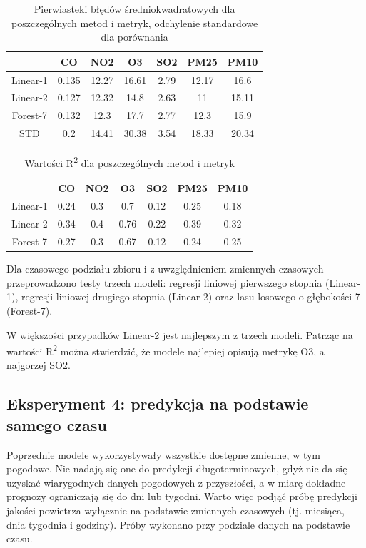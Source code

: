\documentclass[18pt, letterpaper]{article}
\begin{document}
\begin{table}[H]
\centering
\begin{tabular}{|c|c|c|c|c|c|c|}
\hline
         & CO    & NO2   & O3    & SO2  & PM25  & PM10  \\ \hline
Linear-1 & 0.135 & 12.27 & 16.61 & 2.79 & 12.17 & 16.6  \\ \hline
Linear-2 & 0.127 & 12.32 & 14.8  & 2.63 & 11    & 15.11 \\ \hline
Forest-7 & 0.132 & 12.3  & 17.7  & 2.77 & 12.3  & 15.9  \\ \hline
STD      & 0.2   & 14.41 & 30.38 & 3.54 & 18.33 & 20.34 \\ \hline
\end{tabular}
\caption{Pierwiasteki błędów średniokwadratowych dla poszczególnych metod i metryk, odchylenie standardowe dla porównania}
\label{table:general_results}
\end{table}

\begin{table}[H]
\centering
\begin{tabular}{|c|c|c|c|c|c|c|}
\hline
          & CO   & NO2 & O3   & SO2  & PM25 & PM10 \\ \hline
Linear-1 & 0.24 & 0.3 & 0.7  & 0.12 & 0.25 & 0.18 \\ \hline
Linear-2 & 0.34 & 0.4 & 0.76 & 0.22 & 0.39 & 0.32 \\ \hline
Forest-7 & 0.27 & 0.3 & 0.67 & 0.12 & 0.24 & 0.25 \\ \hline
\end{tabular}
\caption{Wartości R\textsuperscript{2} dla poszczególnych metod i metryk}
\label{table:general_results_r2}
\end{table}

Dla czasowego podziału zbioru i z uwzględnieniem zmiennych czasowych przeprowadzono testy trzech modeli: regresji liniowej pierwszego stopnia (Linear-1), regresji liniowej drugiego stopnia (Linear-2) oraz lasu losowego o głębokości 7 (Forest-7). 

W większości przypadków Linear-2 jest najlepszym z trzech modeli. Patrząc na wartości R\textsuperscript{2} można stwierdzić, że modele najlepiej opisują metrykę O3, a najgorzej SO2.

\subsection{Eksperyment 4: predykcja na podstawie samego czasu}

Poprzednie modele wykorzystywały wszystkie dostępne zmienne, w tym pogodowe. Nie nadają się one do predykcji długoterminowych, gdyż nie da się uzyskać wiarygodnych danych pogodowych z przyszłości, a w miarę dokładne prognozy ograniczają się do dni lub tygodni. Warto więc podjąć próbę predykcji jakości powietrza wyłącznie na podstawie zmiennych czasowych (tj. miesiąca, dnia tygodnia i godziny). Próby wykonano przy podziale danych na podstawie czasu.
\end{document}
